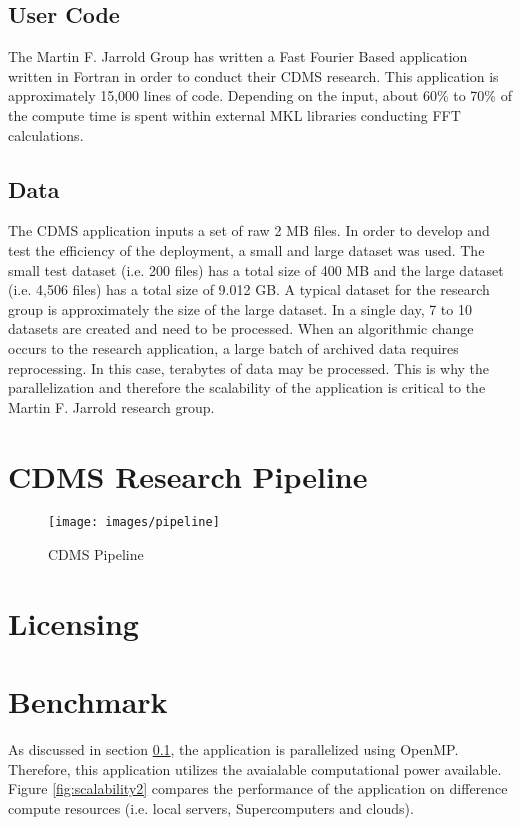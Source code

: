\documentclass[9pt,twocolumn,twoside]{../../styles/osajnl}
\begin{document}
\subsection{User Code} \label{code}
The Martin F. Jarrold Group has written a Fast Fourier Based
application written in Fortran in order to conduct their CDMS
research. This application is approximately 15,000 lines of
code. Depending on the input, about 60\% to 70\% of the compute time
is spent within external MKL libraries conducting FFT calculations.

\subsection{Data} \label{data}
The CDMS application inputs a set of raw 2 MB files. In order to
develop and test the efficiency of the deployment, a small and large
dataset was used. The small test dataset (i.e. 200 files) has a total
size of 400 MB and the large dataset (i.e. 4,506 files) has a total
size of 9.012 GB. A typical dataset for the research group is
approximately the size of the large dataset. In a single day, 7 to 10
datasets are created and need to be processed. When an algorithmic
change occurs to the research application, a large batch of archived
data requires reprocessing. In this case, terabytes of data may be
processed. This is why the parallelization and therefore the
scalability of the application is critical to the Martin F. Jarrold
research group.

\section{CDMS Research Pipeline} \label{cdms}
\begin{figure}
\centering
\texttt{[image: images/pipeline]}
\caption{CDMS Pipeline}
\end{figure}

\section{Licensing} \label{licensing}

\section{Benchmark}
As discussed in section \ref{code}, the application is parallelized
using OpenMP. Therefore, this application utilizes the avaialable
computational power available. Figure \ref{fig:scalability2} compares the performance of the application on difference compute resources (i.e. local servers, Supercomputers and clouds). 
\end{document}
